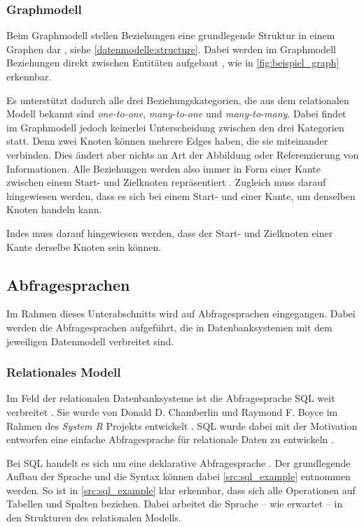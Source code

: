 \subsubsection{Graphmodell}
Beim Graphmodell stellen Beziehungen eine grundlegende Struktur in einem Graphen dar \cite{gdbms}, siehe \autoref{datenmodelle:structure}. Dabei werden im Graphmodell Beziehungen direkt zwischen Entitäten aufgebaut \cite{gdbms}, wie in \autoref{fig:beispiel_graph} erkennbar. 

Es unterstützt dadurch alle drei Beziehungskategorien, die aus dem relationalen Modell bekannt sind \textit{one-to-one}, \textit{many-to-one} und \textit{many-to-many}. Dabei findet im Graphmodell jedoch keinerlei Unterscheidung zwischen den drei Kategorien statt. Denn zwei Knoten können mehrere Edges haben, die sie miteinander verbinden. Dies ändert aber nichts an Art der Abbildung oder Referenzierung von Informationen. Alle Beziehungen werden also immer in Form einer Kante zwischen einem Start- und Zielknoten repräsentiert \cite{gdbms}. Zugleich muss darauf hingewiesen werden, dass es sich bei einem Start- und einer Kante, um denselben Knoten handeln kann. 

Indes muss darauf hingewiesen werden, dass der Start- und Zielknoten einer Kante derselbe Knoten sein können.

\subsection{Abfragesprachen}
Im Rahmen dieses Unterabschnitts wird auf Abfragesprachen eingegangen. Dabei werden die Abfragesprachen aufgeführt, die in Datenbanksystemen mit dem jeweiligen Datenmodell verbreitet sind.

\subsubsection{Relationales Modell}
Im Feld der relationalen Datenbanksysteme ist die Abfragesprache SQL weit verbreitet \cite{sql_history}. Sie wurde von Donald D. Chamberlin und Raymond F. Boyce im Rahmen des \textit{System R} Projekts entwickelt \cite{sql_history}. SQL wurde dabei mit der Motivation entworfen eine einfache Abfragesprache für relationale Daten zu entwickeln \cite{sql_history}. 

Bei SQL handelt es sich um eine deklarative Abfragesprache \cite{sql_history}. Der grundlegende Aufbau der Sprache und die Syntax können dabei \autoref{src:sql_example} entnommen werden. So ist in \autoref{src:sql_example} klar erkennbar, dass sich alle Operationen auf Tabellen und Spalten beziehen. Dabei arbeitet die Sprache -- wie erwartet -- in den Strukturen des relationalen Modells.

